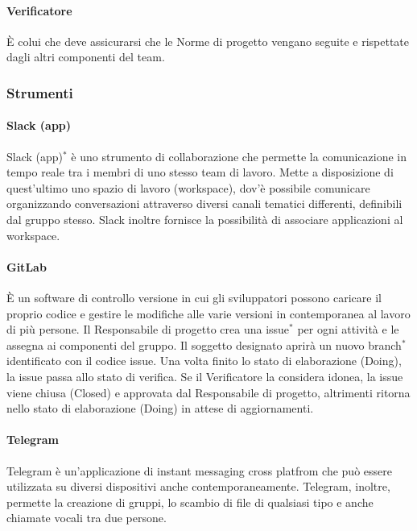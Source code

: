 \documentclass[11pt,a4paper]{article}
\begin{document}
{	\paragraph{Verificatore}
	È colui che deve assicurarsi che le Norme di progetto vengano seguite e rispettate dagli altri componenti del team.
	\subsubsection{Strumenti}
	
	\paragraph{Slack (app)\\}
	Slack (app)$^*$ è uno strumento di collaborazione che permette la comunicazione in tempo reale tra i membri di uno stesso team di lavoro. Mette a disposizione di quest’ultimo uno spazio di lavoro (workspace), dov'è possibile comunicare organizzando conversazioni attraverso diversi canali tematici differenti, definibili dal gruppo stesso.
	Slack inoltre fornisce la possibilità di associare applicazioni al workspace.
	
	\paragraph{GitLab\\}
	È un software di controllo versione in cui gli sviluppatori possono caricare il proprio codice e gestire le modifiche alle varie versioni in contemporanea al lavoro di più persone.
	Il Responsabile di progetto crea una issue$^*$ per ogni attività e le assegna ai componenti del gruppo. Il soggetto designato aprirà un nuovo branch$^*$ identificato con il codice issue.
	Una volta finito lo stato di elaborazione (Doing), la issue passa allo stato di verifica. Se il Verificatore la considera idonea, la issue viene chiusa (Closed) e approvata dal Responsabile di progetto, altrimenti ritorna nello stato di elaborazione (Doing) in attese di aggiornamenti.
	
	\paragraph{Telegram\\}

	Telegram è un'applicazione di instant messaging cross platfrom che può essere utilizzata su diversi dispositivi
	anche contemporaneamente. Telegram, inoltre, permette la creazione di gruppi, lo scambio di file di qualsiasi tipo
	e anche chiamate vocali tra due persone.
	
}
\end{document}
